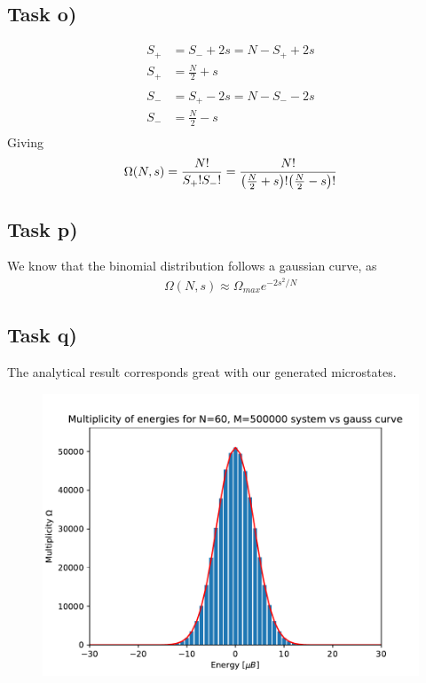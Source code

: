 \documentclass[12p,a4paper]{article}
\begin{document}
\subsection*{Task o)}
\begin{align*}
  S_+ &= S_- + 2s = N - S_+ + 2s \\
  S_+ &= \frac{N}{2} + s \\
\end{align*}
\begin{align*}
  S_- &= S_+ - 2s = N - S_- - 2s \\
  S_- &= \frac{N}{2} - s \\
\end{align*}
Giving
\begin{align*}
  \Omega(N, s) = \frac{N!}{S_+!S_-!} = \frac{N!}{\qty(\frac{N}{2} + s)!\qty(\frac{N}{2} - s)!}
\end{align*}


\subsection*{Task p)}
We know that the binomial distribution follows a gaussian curve, as
\begin{align*}
    \Omega(N,s) \approx \Omega_{max}e^{-2s^2/N}
\end{align*}


\subsection*{Task q)}
The analytical result corresponds great with our generated microstates.
\begin{figure}[H]
    \includegraphics{task_q.pdf}
    \caption{}
    \label{}
\end{figure}
\end{document}
